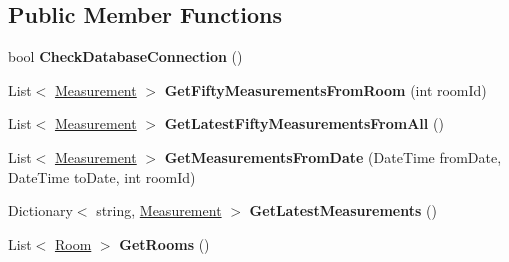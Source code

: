 \subsection*{Public Member Functions}
\begin{DoxyCompactItemize}
\item 
\hypertarget{interface_w_c_f_service_web_role1_1_1_i_service1_a8f00ee69713054a16d9ca49c36894e1c}{}bool {\bfseries Check\+Database\+Connection} ()\label{interface_w_c_f_service_web_role1_1_1_i_service1_a8f00ee69713054a16d9ca49c36894e1c}

\item 
\hypertarget{interface_w_c_f_service_web_role1_1_1_i_service1_ab110be3e5449ab4a054da01efca9d4af}{}List$<$ \hyperlink{class_w_c_f_service_web_role1_1_1_measurement}{Measurement} $>$ {\bfseries Get\+Fifty\+Measurements\+From\+Room} (int room\+Id)\label{interface_w_c_f_service_web_role1_1_1_i_service1_ab110be3e5449ab4a054da01efca9d4af}

\item 
\hypertarget{interface_w_c_f_service_web_role1_1_1_i_service1_a2f9c519200ba30529289f7c0a7fe011b}{}List$<$ \hyperlink{class_w_c_f_service_web_role1_1_1_measurement}{Measurement} $>$ {\bfseries Get\+Latest\+Fifty\+Measurements\+From\+All} ()\label{interface_w_c_f_service_web_role1_1_1_i_service1_a2f9c519200ba30529289f7c0a7fe011b}

\item 
\hypertarget{interface_w_c_f_service_web_role1_1_1_i_service1_a6b5d59c027f59fee7fa0c93f31faddc0}{}List$<$ \hyperlink{class_w_c_f_service_web_role1_1_1_measurement}{Measurement} $>$ {\bfseries Get\+Measurements\+From\+Date} (Date\+Time from\+Date, Date\+Time to\+Date, int room\+Id)\label{interface_w_c_f_service_web_role1_1_1_i_service1_a6b5d59c027f59fee7fa0c93f31faddc0}

\item 
\hypertarget{interface_w_c_f_service_web_role1_1_1_i_service1_a0f98f8ace348304de3344629ae92a641}{}Dictionary$<$ string, \hyperlink{class_w_c_f_service_web_role1_1_1_measurement}{Measurement} $>$ {\bfseries Get\+Latest\+Measurements} ()\label{interface_w_c_f_service_web_role1_1_1_i_service1_a0f98f8ace348304de3344629ae92a641}

\item 
\hypertarget{interface_w_c_f_service_web_role1_1_1_i_service1_a0e5d931c3553c9e6d03c8a63c8fd9101}{}List$<$ \hyperlink{class_w_c_f_service_web_role1_1_1_room}{Room} $>$ {\bfseries Get\+Rooms} ()\label{interface_w_c_f_service_web_role1_1_1_i_service1_a0e5d931c3553c9e6d03c8a63c8fd9101}


\end{DoxyCompactItemize}
